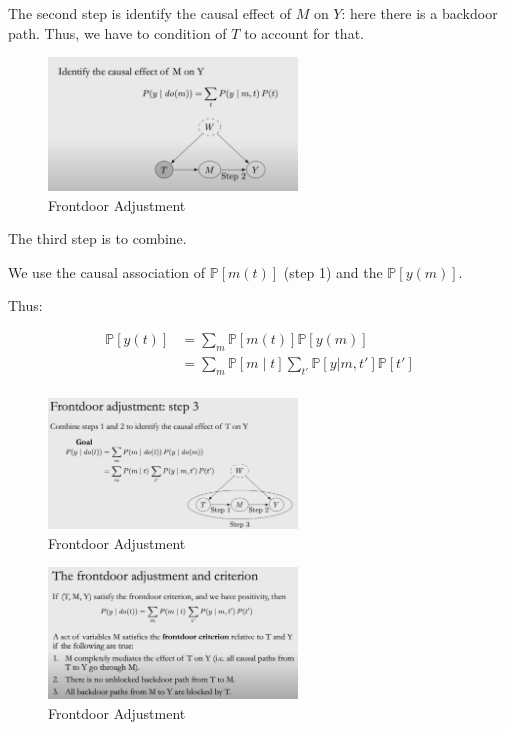 \documentclass{article}
\begin{document}
The second step is identify the causal effect of $M$ on $Y$: here there is a backdoor path. Thus, we have to condition of $T$ to account for that.

\begin{figure}[H]
  \centering
  \includegraphics[width=250px]{draft-photos/frontdoor_adjustment_explanation2.png}
  \caption{Frontdoor Adjustment}
  \label{fig:frontdoor_adjustment_explanation2}
\end{figure}

The third step is to combine.

We use the causal association of $\mathbb{P}[m(t)]$ (step 1) and the $\mathbb{P}[y(m)]$.

Thus:

\begin{align*}
  \mathbb{P}[y(t)]
  &= \sum_m \mathbb{P}[m(t)] \mathbb{P}[y(m)] \\
  &= \sum_m \mathbb{P}[m \mid t] \sum_{t'} \mathbb{P}[y | m, t'] \mathbb{P}[t'] \\
\end{align*}

\begin{figure}[H]
  \centering
  \includegraphics[width=250px]{draft-photos/frontdoor_adjustment_explanation3.png}
  \caption{Frontdoor Adjustment}
  \label{fig:frontdoor_adjustment_explanation3}
\end{figure}

\begin{figure}[H]
  \centering
  \includegraphics[width=250px]{draft-photos/frontdoor_adjustment_explanation4.png}
  \caption{Frontdoor Adjustment}
  \label{fig:frontdoor_adjustment_explanation4}
\end{figure}
\end{document}
